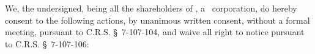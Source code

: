 
\bigskip

We, the undersigned, being all the shareholders of \companyName, a \companyState\ corporation,
do hereby consent to the following actions, by unanimous written consent, without a formal
meeting, pursuant to C.R.S. \S~7-107-104, and waive all right to notice pursuant to
C.R.S. \S~7-107-106:

